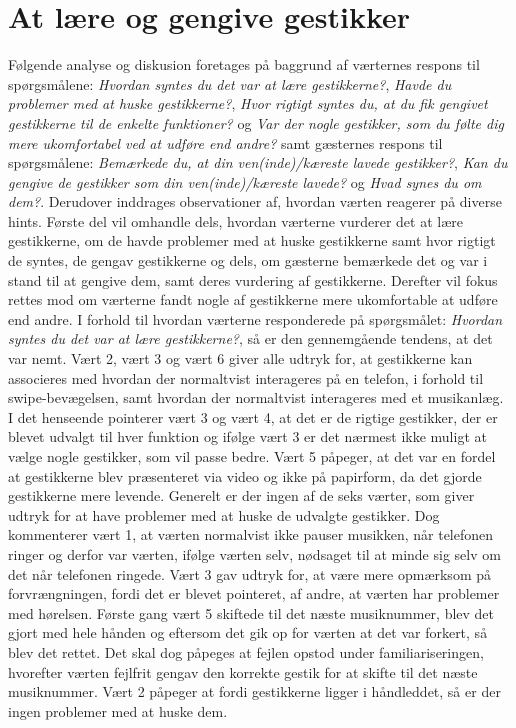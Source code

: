 \section{At lære og gengive gestikker}
\label{TestresultaterSocialAcceptGestikker}
%
Følgende analyse og diskusion foretages på baggrund af værternes respons til spørgsmålene: \textit{Hvordan syntes du det var at lære gestikkerne?}, \textit{Havde du problemer med at huske gestikkerne?}, \textit{Hvor rigtigt syntes du, at du fik gengivet gestikkerne til de enkelte funktioner?} og \textit{Var der nogle gestikker, som du følte dig mere ukomfortabel ved at udføre end andre?} samt gæsternes respons til spørgsmålene: \textit{Bemærkede du, at din ven(inde)/kæreste lavede gestikker?}, \textit{Kan du gengive de gestikker som din ven(inde)/kæreste lavede?} og \textit{Hvad synes du om dem?}. Derudover inddrages observationer af, hvordan værten reagerer på diverse hints. Første del vil omhandle dels, hvordan værterne vurderer det at lære gestikkerne, om de havde problemer med at huske gestikkerne samt hvor rigtigt de syntes, de gengav gestikkerne og dels, om gæsterne bemærkede det og var i stand til at gengive dem, samt deres vurdering af gestikkerne. Derefter vil fokus rettes mod om værterne fandt nogle af gestikkerne mere ukomfortable at udføre end andre.\blankline
%
I forhold til hvordan værterne responderede på spørgsmålet: \textit{Hvordan syntes du det var at lære gestikkerne?}, så er den gennemgående tendens, at det var nemt. Vært 2, vært 3 og vært 6 giver alle udtryk for, at gestikkerne kan associeres med hvordan der normaltvist interageres på en telefon, i forhold til swipe-bevægelsen, samt hvordan der normaltvist interageres med et musikanlæg. I det henseende pointerer vært 3 og vært 4, at det er de rigtige gestikker, der er blevet udvalgt til hver funktion og ifølge vært 3 er det nærmest ikke muligt at vælge nogle gestikker, som vil passe bedre. Vært 5 påpeger, at det var en fordel at gestikkerne blev præsenteret via video og ikke på papirform, da det gjorde gestikkerne mere levende. Generelt er der ingen af de seks værter, som giver udtryk for at have problemer med at huske de udvalgte gestikker. Dog kommenterer vært 1, at værten normalvist ikke pauser musikken, når telefonen ringer og derfor var værten, ifølge værten selv, nødsaget til at minde sig selv om det når telefonen ringede. Vært 3 gav udtryk for, at være mere opmærksom på forvrængningen, fordi det er blevet pointeret, af andre, at værten har problemer med hørelsen. Første gang vært 5 skiftede til det næste musiknummer, blev det gjort med hele hånden og eftersom det gik op for værten at det var forkert, så blev det rettet. Det skal dog påpeges at fejlen opstod under familiariseringen, hvorefter værten fejlfrit gengav den korrekte gestik for at skifte til det næste musiknummer. Vært 2 påpeger at fordi gestikkerne ligger i håndleddet, så er der ingen problemer med at huske dem. 

